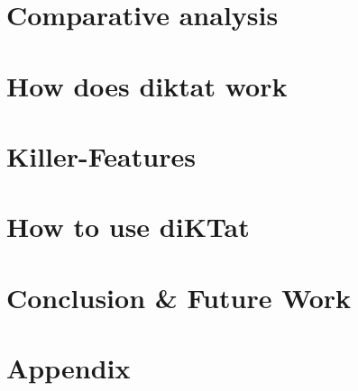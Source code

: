 \documentclass[acmlarge, screen, nonacm]{acmart}
\begin{document}
\section{Comparative analysis}
\label{sec:compare}


\section{How does diktat work}
\label{sec:work}


\section{Killer-Features}
\label{sec:feature}


\section{How to use diKTat}
\label{sec:download}


\section{Conclusion \& Future Work}
\label{sec:conclusion}


\newpage
\nocite{*}



\newpage
\section{Appendix}
\label{sec:appendix}

\end{document}
